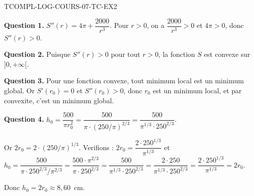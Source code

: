 \begin{corrige}{TCOMPL-LOG-COURS-07-TC-EX2}

\textbf{Question 1.} $S''(r) = 4\pi + \dfrac{2000}{r^3}$. Pour $r > 0$, on a $\dfrac{2000}{r^3} > 0$ et $4\pi > 0$, donc $S''(r) > 0$.

\textbf{Question 2.} Puisque $S''(r) > 0$ pour tout $r > 0$, la fonction $S$ est convexe sur $]0, +\infty[$.

\textbf{Question 3.} Pour une fonction convexe, tout minimum local est un minimum global. Or $S'(r_0) = 0$ et $S''(r_0) > 0$, donc $r_0$ est un minimum local, et par convexite, c'est un minimum global.

\textbf{Question 4.} $h_0 = \dfrac{500}{\pi r_0^2} = \dfrac{500}{\pi \cdot (250/\pi)^{2/3}} = \dfrac{500}{\pi^{1/3} \cdot 250^{2/3}}$.

Or $2r_0 = 2 \cdot (250/\pi)^{1/3}$. Verifions : $2r_0 = \dfrac{2 \cdot 250^{1/3}}{\pi^{1/3}}$ et $h_0 = \dfrac{500}{\pi \cdot 250^{2/3}/\pi^{2/3}} = \dfrac{500 \cdot \pi^{2/3}}{\pi \cdot 250^{2/3}} = \dfrac{500}{\pi^{1/3} \cdot 250^{2/3}} = \dfrac{2 \cdot 250}{\pi^{1/3} \cdot 250^{2/3}} = \dfrac{2 \cdot 250^{1/3}}{\pi^{1/3}} = 2r_0$.

Donc $h_0 = 2r_0 \approx 8{,}60$~cm.

\end{corrige}
